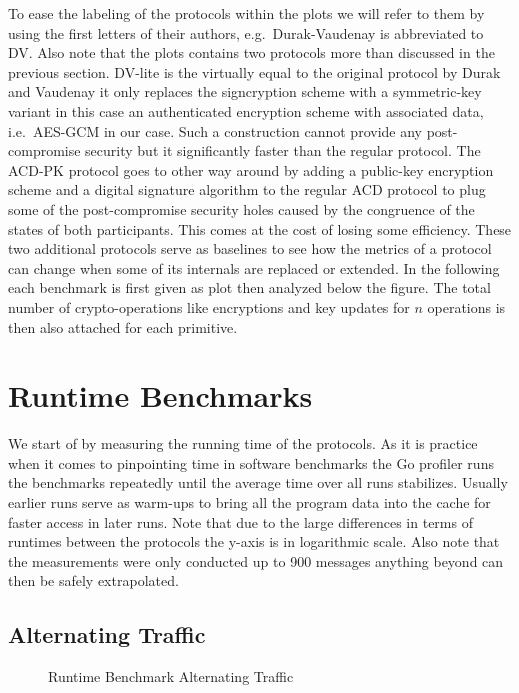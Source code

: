 \documentclass[11pt,a4paper,twoside,openright,bibliography=totoc]{scrbook}
\begin{document}
To ease the labeling of the protocols within the plots we will
refer to them by using the first letters of their authors,
e.g.~Durak-Vaudenay is abbreviated to DV. Also note that
the plots contains two protocols more than discussed in
the previous section. DV-lite is the virtually equal to
the original protocol by Durak and Vaudenay it only replaces
the signcryption scheme with a symmetric-key variant in
this case an authenticated encryption scheme with associated
data, i.e.~AES-GCM in our case. Such a construction cannot provide
any post-compromise security but it significantly faster
than the regular protocol. The ACD-PK protocol goes to other way around
by adding a public-key encryption scheme and a digital signature
algorithm to the regular ACD protocol to plug some
of the post-compromise security holes caused by
the congruence of the states of both participants.
This comes at the cost of losing some efficiency.
These two additional protocols serve as baselines
to see how the metrics of a protocol can change when
some of its internals are replaced or extended. In the
following each benchmark is first given as plot then
analyzed below the figure.
The total number of
crypto-operations like encryptions and key updates
for $n$ operations is then also attached for each
primitive.

\section{Runtime Benchmarks}
\label{sec:runtime-benchmarks}

We start of by measuring the running time of the protocols. As
it is practice when it comes to pinpointing time in software
benchmarks the Go profiler runs the benchmarks repeatedly
until the average time over all runs stabilizes. Usually
earlier runs serve as warm-ups to bring all the program
data into the cache for faster access in later runs.
Note that due to the large differences in terms
of runtimes between the protocols the y-axis is
in logarithmic scale. Also note that the measurements
were only conducted up to 900 messages anything beyond
can then be safely extrapolated.

\subsection{Alternating Traffic}
\label{sec:alternating-traffic}

\begin{figure}[H]
  \centering
   
  \caption{Runtime Benchmark Alternating Traffic}
  \label{fig:time-alt}
\end{figure}
\end{document}
